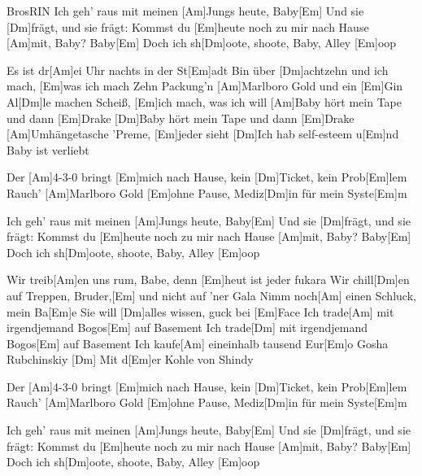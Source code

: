 \documentclass[../main.tex]{subfiles}
\begin{document}
\begin{song}[3]{Bros}{RIN}{}
Ich geh' raus mit meinen [Am]Jungs heute, Baby[Em]
Und sie [Dm]frägt, und sie frägt:
Kommst du [Em]heute noch zu mir nach Hause [Am]mit, Baby? Baby[Em]{\hh}
Doch ich sh[Dm]oote, shoote, Baby, Alley [Em]oop

Es ist dr[Am]ei Uhr nachts in der St[Em]adt
Bin über [Dm]achtzehn und ich mach, [Em]was ich mach
Zehn Packung'n [Am]Marlboro Gold und ein [Em]Gin
Al[Dm]le machen Scheiß, [Em]ich mach, was ich will
[Am]Baby hört mein Tape und dann [Em]Drake
[Dm]Baby hört mein Tape und dann [Em]Drake
[Am]Umhängetasche 'Preme, [Em]jeder sieht
[Dm]Ich hab self-esteem u[Em]nd Baby ist verliebt

Der [Am]4-3-0 bringt [Em]mich nach Hause, kein [Dm]Ticket, kein Prob[Em]lem
Rauch' [Am]Marlboro Gold [Em]ohne Pause, Mediz[Dm]in für mein Syste[Em]m

Ich geh' raus mit meinen [Am]Jungs heute, Baby[Em]{\hh}
Und sie [Dm]frägt, und sie frägt:
Kommst du [Em]heute noch zu mir nach Hause [Am]mit, Baby? Baby[Em]{\hh}
Doch ich sh[Dm]oote, shoote, Baby, Alley [Em]oop

Wir treib[Am]en uns rum, Babe, denn [Em]heut ist jeder fukara
Wir chill[Dm]en auf Treppen, Bruder,[Em] und nicht auf 'ner Gala
Nimm noch[Am] einen Schluck, mein Ba[Em]e
Sie will [Dm]alles wissen, guck bei [Em]Face
Ich trade[Am] mit irgendjemand Bogos[Em] auf Basement
Ich trade[Dm] mit irgendjemand Bogos[Em] auf Basement
Ich kaufe[Am] eineinhalb tausend Eur[Em]o Gosha Rubchinskiy
[Dm] \hh Mit d[Em]er Kohle von Shindy

Der [Am]4-3-0 bringt [Em]mich nach Hause, kein [Dm]Ticket, kein Prob[Em]lem
Rauch' [Am]Marlboro Gold [Em]ohne Pause, Mediz[Dm]in für mein Syste[Em]m

Ich geh' raus mit meinen [Am]Jungs heute, Baby[Em]{\hh}
Und sie [Dm]frägt, und sie frägt:
Kommst du [Em]heute noch zu mir nach Hause [Am]mit, Baby? Baby[Em]{\hh}
Doch ich sh[Dm]oote, shoote, Baby, Alley [Em]oop
\end{song}
\end{document}
